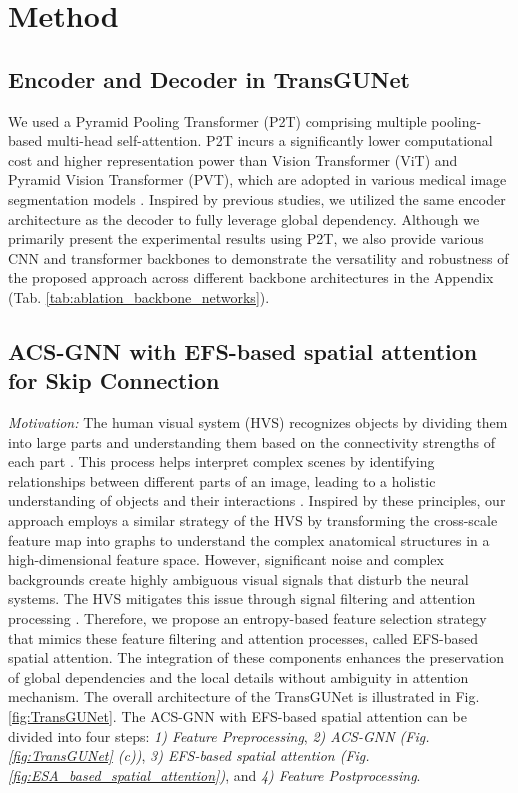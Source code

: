 \section{Method}

\subsection{Encoder and Decoder in TransGUNet}

We used a Pyramid Pooling Transformer (P2T) \cite{wu2022p2t} comprising multiple pooling-based multi-head self-attention. P2T incurs a significantly lower computational cost and higher representation power than Vision Transformer (ViT) and Pyramid Vision Transformer (PVT), which are adopted in various medical image segmentation models \cite{dong2108polyp, zhang2022hsnet, liu2024cafe}. Inspired by previous studies, we utilized the same encoder architecture as the decoder to fully leverage global dependency. Although we primarily present the experimental results using P2T, we also provide various CNN and transformer backbones to demonstrate the versatility and robustness of the proposed approach across different backbone architectures in the Appendix (Tab. \ref{tab:ablation_backbone_networks}).

\subsection{ACS-GNN with EFS-based spatial attention for Skip Connection}

\noindent \textit{Motivation:} The human visual system (HVS) recognizes objects by dividing them into large parts and understanding them based on the connectivity strengths of each part \cite{majaj2015simple}. This process helps interpret complex scenes by identifying relationships between different parts of an image, leading to a holistic understanding of objects and their interactions \cite{palmer1999vision, marr2010vision}. Inspired by these principles, our approach employs a similar strategy of the HVS by transforming the cross-scale feature map into graphs to understand the complex anatomical structures in a high-dimensional feature space. However, significant noise and complex backgrounds create highly ambiguous visual signals that disturb the neural systems. The HVS mitigates this issue through signal filtering and attention processing \cite{posner1990attention, treue2001neural}. Therefore, we propose an entropy-based feature selection strategy that mimics these feature filtering and attention processes, called EFS-based spatial attention. The integration of these components enhances the preservation of global dependencies and the local details without ambiguity in attention mechanism. The overall architecture of the TransGUNet is illustrated in Fig. \ref{fig:TransGUNet}. The ACS-GNN with EFS-based spatial attention can be divided into four steps: \textit{1) Feature Preprocessing}, \textit{2) ACS-GNN (Fig. \ref{fig:TransGUNet} (c))}, \textit{3) EFS-based spatial attention (Fig. \ref{fig:ESA_based_spatial_attention})}, and \textit{4) Feature Postprocessing}.

